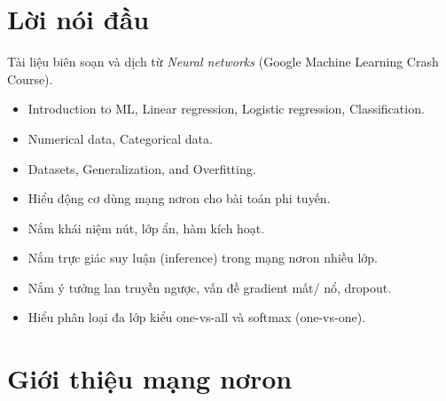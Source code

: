 \documentclass[12pt,a4paper]{article}
\begin{document}

\newpage
\tableofcontents
\newpage

\section*{Lời nói đầu}

\begin{ynghia}[title={Nguồn và cách đọc}]
Tài liệu biên soạn và dịch từ \emph{Neural networks} (Google Machine Learning Crash Course).
\end{ynghia}

\begin{luuy}[title={Điều kiện tiên quyết}]
\begin{itemize}
  \item Introduction to ML, Linear regression, Logistic regression, Classification.
  \item Numerical data, Categorical data.
  \item Datasets, Generalization, and Overfitting.
\end{itemize}
\end{luuy}

\begin{phuongphap}[title={target học tập}]
\begin{itemize}
  \item Hiểu động cơ dùng mạng nơron cho bài toán phi tuyến.
  \item Nắm khái niệm nút, lớp ẩn, hàm kích hoạt.
  \item Nắm trực giác suy luận (inference) trong mạng nơron nhiều lớp.
  \item Nắm ý tưởng lan truyền ngược, vấn đề gradient mất/ nổ, dropout.
  \item Hiểu phân loại đa lớp kiểu one-vs-all và softmax (one-vs-one).
\end{itemize}
\end{phuongphap}

\newpage

\section{Giới thiệu mạng nơron}
\end{document}
